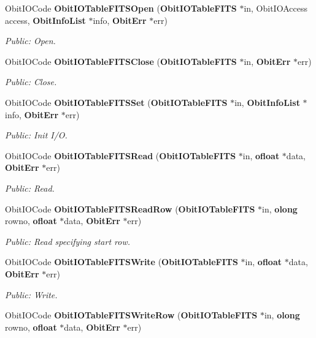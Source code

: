\begin{CompactItemize}
Obit\-IOCode {\bf Obit\-IOTable\-FITSOpen} ({\bf Obit\-IOTable\-FITS} $\ast$in, Obit\-IOAccess access, {\bf Obit\-Info\-List} $\ast$info, {\bf Obit\-Err} $\ast$err)
\begin{CompactList}\small\item\em Public: Open. \item\end{CompactList}\item 
Obit\-IOCode {\bf Obit\-IOTable\-FITSClose} ({\bf Obit\-IOTable\-FITS} $\ast$in, {\bf Obit\-Err} $\ast$err)
\begin{CompactList}\small\item\em Public: Close. \item\end{CompactList}\item 
Obit\-IOCode {\bf Obit\-IOTable\-FITSSet} ({\bf Obit\-IOTable\-FITS} $\ast$in, {\bf Obit\-Info\-List} $\ast$info, {\bf Obit\-Err} $\ast$err)
\begin{CompactList}\small\item\em Public: Init I/O. \item\end{CompactList}\item 
Obit\-IOCode {\bf Obit\-IOTable\-FITSRead} ({\bf Obit\-IOTable\-FITS} $\ast$in, {\bf ofloat} $\ast$data, {\bf Obit\-Err} $\ast$err)
\begin{CompactList}\small\item\em Public: Read. \item\end{CompactList}\item 
Obit\-IOCode {\bf Obit\-IOTable\-FITSRead\-Row} ({\bf Obit\-IOTable\-FITS} $\ast$in, {\bf olong} rowno, {\bf ofloat} $\ast$data, {\bf Obit\-Err} $\ast$err)
\begin{CompactList}\small\item\em Public: Read specifying start row. \item\end{CompactList}\item 
Obit\-IOCode {\bf Obit\-IOTable\-FITSWrite} ({\bf Obit\-IOTable\-FITS} $\ast$in, {\bf ofloat} $\ast$data, {\bf Obit\-Err} $\ast$err)
\begin{CompactList}\small\item\em Public: Write. \item\end{CompactList}\item 
Obit\-IOCode {\bf Obit\-IOTable\-FITSWrite\-Row} ({\bf Obit\-IOTable\-FITS} $\ast$in, {\bf olong} rowno, {\bf ofloat} $\ast$data, {\bf Obit\-Err} $\ast$err)

\end{CompactItemize}
